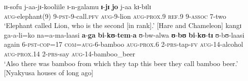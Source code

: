\begin{exe}
\ex \label{exPRSnonPSTRelativeTimeless1}\gll ɪɪ-sofu j-aa-jɪ-kooliile ɪ-n-galamu \textbf{ɪ}-\textbf{jɪ} \textbf{jo} j-aa kɪ-bɪlɪ\\
\textsc{aug}-elephant(9) 9-\textsc{pst}-9-call.\textsc{pfv} \textsc{aug}-9-lion \textsc{aug}-\textsc{prox.9} \textsc{ref.9} 9-\textsc{assoc} 7-two\\
\glt \lq Elephant called Lion, who is the second [in rank].' [Hare and Chameleon]
\ex \label{exPRSnonPSTRelativeTimeless2}\gll kangɪ ga-a-li=ko na=a-ma-laasi \textbf{a}-\textbf{ga} \textbf{bi}-\textbf{kʊ}-\textbf{tem}-\textbf{a} ʊ-bw-alwa \textbf{ʊ}-\textbf{bʊ} \textbf{bi}-\textbf{kʊ}-\textbf{tɪ} ʊ-bʊ-laasi\\
again 6-\textsc{pst}-\textsc{cop}=17 \textsc{com}=\textsc{aug}-6-bamboo \textsc{aug}-\textsc{prox.6} 2-\textsc{prs}-tap-\textsc{fv} \textsc{aug}-14-alcohol \textsc{aug}-\textsc{prox.14} 2-\textsc{prs}-say \textsc{aug}-14-bamboo\_beer\\
\glt \lq Also there was bamboo from which they tap this beer they call bamboo beer.' [Nyakyusa houses of long ago]
\end{exe}

